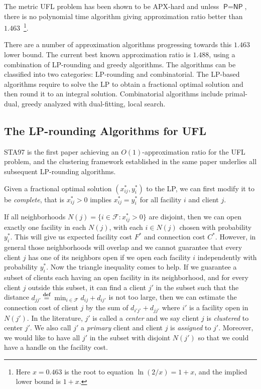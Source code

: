 \documentclass{article}[11pt]
\newcommand{\fac}{\mathcal{F}}
\newcommand{\PP}{\textsf{P}}
\newcommand{\NP}{\textsf{NP}}
\newcommand{\suchthat}{:}
\newcommand{\defeq}{\stackrel{\textbf{def}}{=}}
\begin{document}
The metric UFL problem has been shown to be APX-hard and unless $\PP =
\NP$, there is no polynomial time algorithm giving approximation ratio
better than $1.463$~\footnote{Here $x=0.463$ is the root to equation
  $\ln (2/x) = 1+x$, and the implied lower bound is $1+x$.}.

There are a number of approximation algorithms progressing towards
this $1.463$ lower bound. The current best known approximation ratio
is $1.488$, using a combination of LP-rounding and greedy algorithms.
The algorithms can be classified into two categories: LP-rounding and
combinatorial. The LP-based algorithms require to solve the LP to
obtain a fractional optimal solution and then round it to an integral
solution. Combinatorial algorithms include primal-dual, greedy
analyzed with dual-fitting, local search.

\subsection{The LP-rounding Algorithms for UFL}
STA97 is the first paper achieving an $O(1)$-approximation ratio for
the UFL problem, and the clustering framework established in the same
paper underlies all subsequent LP-rounding algorithms.

Given a fractional optimal solution $(x_{ij}^\ast, y_i^\ast)$ to the
LP, we can first modify it to be \emph{complete}, that is
$x_{ij}^\ast>0$ implies $x_{ij}^\ast = y_i^\ast$ for all facility $i$
and client $j$.  

If all neighborhoods $N(j) = \{i\in\fac \suchthat x_{ij}^\ast > 0\}$
are disjoint, then we can open exactly one facility in each $N(j)$,
with each $i\in N(j)$ chosen with probability $y_i^\ast$. This will
give us expected facility cost $F^\ast$ and connection cost $C^\ast$.
However, in general those neighborhoods will overlap and we cannot
guarantee that every client $j$ has one of its neighbors open if we
open each facility $i$ independently with probability $y_i^\ast$. Now
the triangle inequality comes to help. If we guarantee a subset of
clients each having an open facility in its neighborhood, and for
every client $j$ outside this subset, it can find a client $j'$ in the
subset such that the distance $d_{j j'} \defeq \min_{i\in\fac} d_{ij}
+ d_{ij'}$ is not too large, then we can estimate the connection cost
of client $j$ by the sum of $d_{i' j'} + d_{j j'}$ where $i'$ is a
facility open in $N(j')$. In the literature, $j'$ is called a
\emph{center} and we say client $j$ is \emph{clustered} to center
$j'$. We also call $j'$ a \emph{primary} client and client $j$ is
\emph{assigned} to $j'$. Moreover, we would like to have all $j'$ in
the subset with disjoint $N(j')$ so that we could have a handle on the
facility cost.
\end{document}

